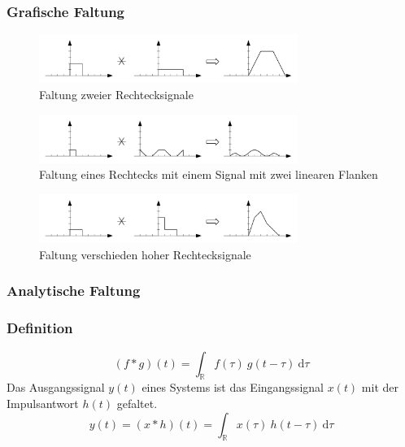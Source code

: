 \documentclass[10pt,a4paper]{article}
\begin{document}
\subsubsection*{Grafische Faltung}
\begin{figure}[H]
	\centering
	\includegraphics[width=0.75\textwidth]{img/faltung1.pdf}
	\caption*{Faltung zweier Rechtecksignale}
\end{figure}
\begin{figure}[H]
	\centering
	\includegraphics[width=0.75\textwidth]{img/faltung2.pdf}
	\caption*{Faltung eines Rechtecks mit einem Signal mit zwei linearen Flanken}
\end{figure}
\begin{figure}[H]
	\centering
	\includegraphics[width=0.75\textwidth]{img/faltung3.pdf}
	\caption*{Faltung verschieden hoher Rechtecksignale}
\end{figure}
\subsubsection*{Analytische Faltung}
\subsubsection*{Definition}
\[ (f \ast g)(t)=\int_\mathbb{R}f(\tau) ~ g(t-\tau) ~ \mathrm d\tau \]
Das Ausgangssignal $y(t)$ eines Systems ist das Eingangssignal $x(t)$ mit der Impulsantwort $h(t)$ gefaltet.
\[ y(t) = (x \ast h)(t)=\int_\mathbb{R}x(\tau) ~ h(t-\tau) ~ \mathrm d\tau\]
\end{document}
